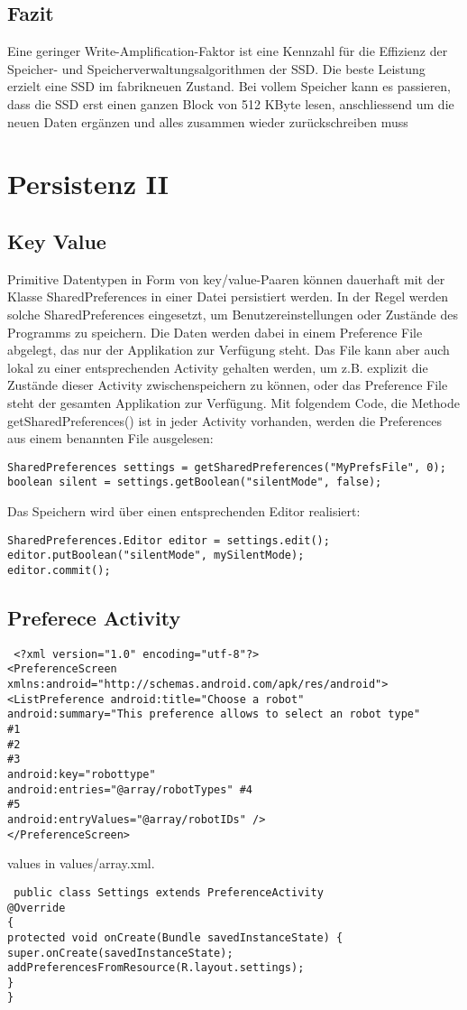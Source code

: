 \documentclass[a4paper,10pt,titlepage=false]{scrreprt}
\begin{document}
\section{Fazit}
 Eine geringer Write-Amplification-Faktor ist eine
Kennzahl für die Effizienz der Speicher- und
Speicherverwaltungsalgorithmen der SSD.
 Die beste Leistung erzielt eine SSD im
fabrikneuen Zustand.
 Bei vollem Speicher kann es passieren, dass
die SSD erst einen ganzen Block von 512 KByte
lesen, anschliessend um die neuen Daten
ergänzen und alles zusammen wieder
zurückschreiben muss


\chapter{Persistenz II}

\section{Key Value}
Primitive Datentypen in Form von key/value-Paaren können dauerhaft mit der Klasse
SharedPreferences in einer Datei persistiert werden. In der Regel werden solche
SharedPreferences eingesetzt, um
 Benutzereinstellungen oder
 Zustände des Programms
zu speichern.
Die Daten werden dabei in einem Preference File abgelegt, das nur der Applikation zur Verfügung
steht. Das File kann aber auch lokal zu einer entsprechenden Activity gehalten werden, um z.B.
explizit die Zustände dieser Activity zwischenspeichern zu können, oder das Preference File steht
der gesamten Applikation zur Verfügung.
Mit folgendem Code, die Methode getSharedPreferences() ist in jeder Activity vorhanden,
werden die Preferences aus einem benannten File ausgelesen:
\begin{lstlisting}
SharedPreferences settings = getSharedPreferences("MyPrefsFile", 0);
boolean silent = settings.getBoolean("silentMode", false);
\end{lstlisting}
Das Speichern wird über einen entsprechenden Editor realisiert:
\begin{lstlisting}
SharedPreferences.Editor editor = settings.edit();
editor.putBoolean("silentMode", mySilentMode);
editor.commit();
\end{lstlisting}

\section{Preferece Activity}
\begin{lstlisting}
 <?xml version="1.0" encoding="utf-8"?>
<PreferenceScreen xmlns:android="http://schemas.android.com/apk/res/android">
<ListPreference android:title="Choose a robot"
android:summary="This preference allows to select an robot type"
#1
#2
#3
android:key="robottype"
android:entries="@array/robotTypes" #4
#5
android:entryValues="@array/robotIDs" />
</PreferenceScreen>
\end{lstlisting}
values in values/array.xml.
\begin{lstlisting}
 public class Settings extends PreferenceActivity
@Override
{
protected void onCreate(Bundle savedInstanceState) {
super.onCreate(savedInstanceState);
addPreferencesFromResource(R.layout.settings);
}
}
\end{lstlisting}
\end{document}
